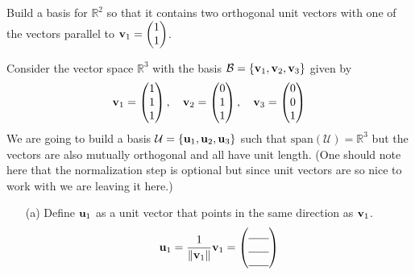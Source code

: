 \begin{problem}
    Build a basis for $\mathbb{R}^2$ so that it contains two orthogonal unit vectors with
    one of the vectors parallel to ${\bf v}_1 = \begin{pmatrix} 1\\1\end{pmatrix}$.
\end{problem}

\begin{problem}
    Consider the vector space $\mathbb{R}^3$ with the basis $\mathcal{B} = \{{\bf v}_1, {\bf v}_2,
    {\bf v}_3\}$ given by
    \[ {\bf v}_1 = \begin{pmatrix} 1\\1\\1\end{pmatrix}, \quad {\bf v}_2 = \begin{pmatrix} 0
            \\1\\1\end{pmatrix},\quad {\bf v}_3 = \begin{pmatrix} 0\\0\\1\end{pmatrix} \]
                We are going to build a basis $\mathcal{U} = \{{\bf u}_1, {\bf u}_2, {\bf u}_3\}$ such that $\text{span}(\mathcal{U}) =
    \mathbb{R}^3$ but the vectors are also mutually orthogonal and all have unit length.
    (One should note here that the normalization step is optional but since unit vectors
    are so nice to work with we are leaving it here.)
    \begin{enumerate}
        \item[(a)] Define ${\bf u}_1$ as a unit vector that points in the same direction as
            ${\bf v}_1$.
            \[ {\bf u}_1 = \frac{1}{\|{\bf v}_1\|} {\bf v}_1 =  \begin{pmatrix} \underline{\hspace{0.25in}} \\
                    \underline{\hspace{0.25in}} \\ \underline{\hspace{0.25in}} \end{pmatrix}
                    \]
\end{enumerate}
\end{problem}
